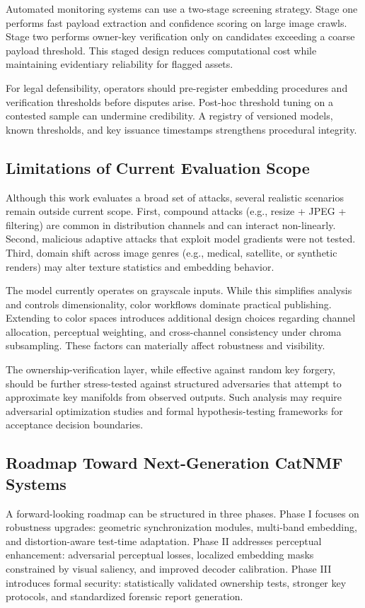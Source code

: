 \documentclass[journal]{IEEEtran}
\begin{document}
Automated monitoring systems can use a two-stage screening strategy. Stage one
performs fast payload extraction and confidence scoring on large image crawls.
Stage two performs owner-key verification only on candidates exceeding a coarse
payload threshold. This staged design reduces computational cost while
maintaining evidentiary reliability for flagged assets.

For legal defensibility, operators should pre-register embedding procedures and
verification thresholds before disputes arise. Post-hoc threshold tuning on a
contested sample can undermine credibility. A registry of versioned models,
known thresholds, and key issuance timestamps strengthens procedural integrity.

\subsection{Limitations of Current Evaluation Scope}

Although this work evaluates a broad set of attacks, several realistic scenarios
remain outside current scope. First, compound attacks (e.g., resize + JPEG +
filtering) are common in distribution channels and can interact non-linearly.
Second, malicious adaptive attacks that exploit model gradients were not tested.
Third, domain shift across image genres (e.g., medical, satellite, or synthetic
renders) may alter texture statistics and embedding behavior.

The model currently operates on grayscale inputs. While this simplifies analysis
and controls dimensionality, color workflows dominate practical publishing.
Extending to color spaces introduces additional design choices regarding channel
allocation, perceptual weighting, and cross-channel consistency under chroma
subsampling. These factors can materially affect robustness and visibility.

The ownership-verification layer, while effective against random key forgery,
should be further stress-tested against structured adversaries that attempt to
approximate key manifolds from observed outputs. Such analysis may require
adversarial optimization studies and formal hypothesis-testing frameworks for
acceptance decision boundaries.

\subsection{Roadmap Toward Next-Generation CatNMF Systems}

A forward-looking roadmap can be structured in three phases. Phase I
focuses on robustness upgrades: geometric synchronization modules, multi-band
embedding, and distortion-aware test-time adaptation. Phase II addresses
perceptual enhancement: adversarial perceptual losses, localized embedding masks
constrained by visual saliency, and improved decoder calibration. Phase III
introduces formal security: statistically validated ownership tests, stronger
key protocols, and standardized forensic report generation.
\end{document}
